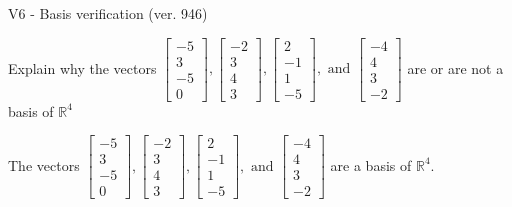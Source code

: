 \begin{exercise}
  \begin{exerciseTitle}V6 - Basis verification (ver. 946)\end{exerciseTitle}
  \begin{exerciseStatement}
    Explain why the vectors \(\left[\begin{array}{r}
-5 \\
3 \\
-5 \\
0
\end{array}\right] , \left[\begin{array}{r}
-2 \\
3 \\
4 \\
3
\end{array}\right] , \left[\begin{array}{r}
2 \\
-1 \\
1 \\
-5
\end{array}\right] , \text{ and } \left[\begin{array}{r}
-4 \\
4 \\
3 \\
-2
\end{array}\right]\) are or are not a basis of \(\mathbb{R}^4\)	


  \end{exerciseStatement}
  \begin{exerciseAnswer}
   The vectors \(\left[\begin{array}{r}
-5 \\
3 \\
-5 \\
0
\end{array}\right] , \left[\begin{array}{r}
-2 \\
3 \\
4 \\
3
\end{array}\right] , \left[\begin{array}{r}
2 \\
-1 \\
1 \\
-5
\end{array}\right] , \text{ and } \left[\begin{array}{r}
-4 \\
4 \\
3 \\
-2
\end{array}\right]\) 
  	 are  a basis of \(\mathbb{R}^4\).
  


  \end{exerciseAnswer}
\end{exercise}